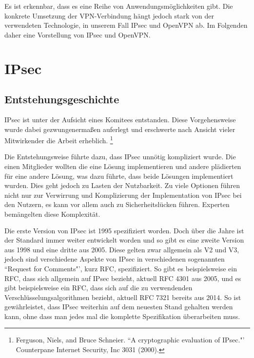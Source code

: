 \documentclass[12pt]{scrartcl}
\begin{document}
Es ist erkennbar, dass es eine Reihe von Anwendungsmöglichkeiten gibt. Die konkrete Umsetzung der VPN-Verbindung hängt jedoch stark von der verwendeten Technologie, in unserem Fall IPsec und OpenVPN ab. Im Folgenden daher eine Vorstellung von IPsec und OpenVPN.

\section{IPsec}
\subsection{Entstehungsgeschichte}
IPsec ist unter der Aufsicht eines Komitees entstanden. Diese Vorgehensweise wurde dabei gezwungenermaßen auferlegt und erschwerte nach Ansicht vieler Mitwirkender die Arbeit erheblich. \footnote{Ferguson, Niels, and Bruce Schneier. ``A cryptographic evaluation of IPsec."' Counterpane Internet Security, Inc 3031 (2000).} 

Die Entstehungsweise führte dazu, dass IPsec unnötig kompliziert wurde. Die einen Mitglieder wollten die eine Lösung implementieren und andere plädierten für eine andere Lösung, was dazu führte, dass beide Lösungen implementiert wurden. Dies geht jedoch zu Lasten der Nutzbarkeit. Zu viele Optionen führen nicht nur zur Verwirrung und Komplizierung der Implementation von IPsec bei den Nutzern, es kann vor allem auch zu Sicherheitslücken führen. Experten bemängelten diese Komplexität.

Die erste Version von IPsec ist 1995\cite{RFC1825} spezifiziert worden. Doch über die Jahre ist der Standard immer weiter entwickelt worden und so gibt es eine zweite Version aus 1998\cite{RFC2401} und eine dritte aus 2005\cite{RFC4301}. Diese gelten zwar allgemein als V2 und V3, jedoch sind verschiedene Aspekte von IPsec in verschiedenen sogenannten ``Request for Comments"', kurz RFC, spezifiziert. So gibt es beispielsweise ein RFC, dass sich allgemein auf IPsec bezieht, aktuell RFC 4301 aus 2005, und es gibt beispielsweise ein RFC, dass sich auf die zu verwendenden Verschlüsselungsalgorithmen bezieht, aktuell RFC 7321 bereits aus 2014. So ist gewährleistet, dass IPsec weiterhin auf dem neuesten Stand gehalten werden kann, ohne dass man jedes mal die komplette Spezifikation überarbeiten muss.
\end{document}
